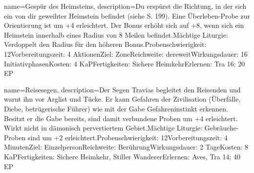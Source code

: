 {
    name={Gespür des Heimsteins},
    description={Du erspürst die Richtung, in der sich ein von dir geweihter Heimstein befindet (siehe S. 199). Eine Überleben-Probe zur Orientierung ist um +4 erleichtert. Der Bonus erhöht sich auf +8, wenn sich ein Heimstein innerhalb eines Radius von 8 Meilen befindet.\newline Mächtige Liturgie: Verdoppelt den Radius für den höheren Bonus.\newline Probenschwierigkeit: 12\newline Vorbereitungszeit: 4 Aktionen\newline Ziel: Zone\newline Reichweite: dereweit\newline Wirkungsdauer: 16 Initiativphasen\newline Kosten: 4 KaP\newline Fertigkeiten: Sichere Heimkehr\newline Erlernen: Tra 16; 20 EP}
}


{
    name={Reisesegen},
    description={Der Segen Travias begleitet den Reisenden und warnt ihn vor Arglist und Tücke. Er kann Gefahren der Zivilisation (Überfälle, Diebe, betrügerische Führer) wie mit der Gabe Gefahreninstinkt erkennen. Besitzt er die Gabe bereits, sind damit verbundene Proben um +4 erleichtert. Wirkt nicht in dämonisch pervertiertem Gebiet.\newline Mächtige Liturgie: Gebräuche-Proben sind um +2 erleichtert.\newline Probenschwierigkeit: 12\newline Vorbereitungszeit: 4 Minuten\newline Ziel: Einzelperson\newline Reichweite: Berührung\newline Wirkungsdauer: 2 Tage\newline Kosten: 8 KaP\newline Fertigkeiten: Sichere Heimkehr, Stiller Wanderer\newline Erlernen: Aves, Tra 14; 40 EP}
}


